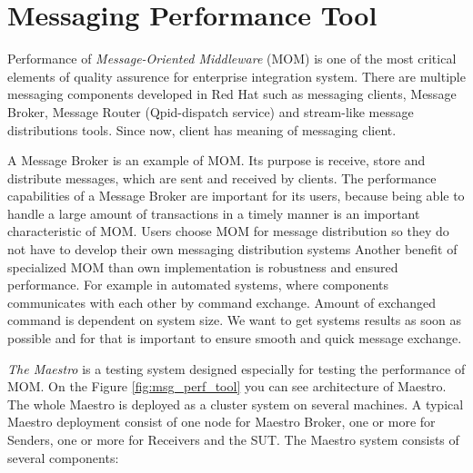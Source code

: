 
\chapter{Messaging Performance Tool}
\label{Messaging Performance Tool}
Performance of \emph{Message-Oriented Middleware} (MOM) \cite{CURRY:MOM} is one of the most critical elements of quality assurence for enterprise integration system. There are multiple messaging components developed in Red Hat such as messaging clients, Message Broker, Message Router (Qpid-dispatch service) and stream-like message distributions tools. Since now, client has meaning of messaging client.  

A Message Broker is an example of MOM. Its purpose is receive, store and distribute messages, which are sent and received by clients. The performance capabilities of a Message Broker are important for its users, because being able to handle a large amount of transactions in a timely manner is an important characteristic of MOM. Users choose MOM for message distribution so they do not have to develop their own messaging distribution systems Another benefit of specialized MOM than own implementation is robustness and ensured performance. For example in automated systems, where components communicates with each other by command exchange. Amount of exchanged command is dependent on system size. We want to get systems results as soon as possible and for that is important to ensure smooth and quick message exchange.

\emph{The Maestro} \cite{ORPISKE:MSGPT} is a testing system designed especially for testing the performance of MOM. On the Figure \ref{fig:msg_perf_tool} you can see architecture of Maestro. The whole Maestro is deployed as a cluster system on several machines. A typical Maestro deployment consist of one node for Maestro Broker, one or more for Senders, one or more for Receivers and the SUT. The Maestro system consists of several components:

